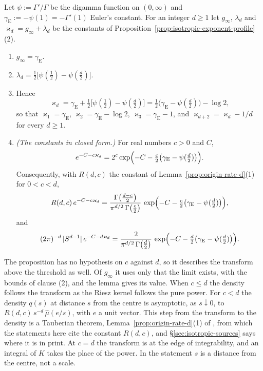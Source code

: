 \begin{lemma}\label{lem:exponent-profile-constant}
Let $\psi := \Gamma'/\Gamma$ be the digamma function on $(0,\infty)$ and
$\gamma_{\mathrm E} := -\psi(1) = -\Gamma'(1)$ Euler's constant. For an integer $d \ge 1$ let
$g_\infty$, $\lambda_d$ and $\varkappa_d = g_\infty + \lambda_d$ be the constants of
Proposition~\ref{prop:isotropic-exponent-profile}(2).
\begin{enumerate}
\item $g_\infty = \gamma_{\mathrm E}$.
\item $\lambda_d = \tfrac12\bigl[\psi(\tfrac12) - \psi(\tfrac d2)\bigr]$.
\item Hence
\[
  \varkappa_d = \gamma_{\mathrm E} + \tfrac12\bigl[\psi(\tfrac12) - \psi(\tfrac d2)\bigr]
   = \tfrac12\bigl(\gamma_{\mathrm E} - \psi(\tfrac d2)\bigr) - \log 2 ,
\]
so that $\varkappa_1 = \gamma_{\mathrm E}$, $\varkappa_2 = \gamma_{\mathrm E} - \log 2$,
$\varkappa_3 = \gamma_{\mathrm E} - 1$, and $\varkappa_{d+2} = \varkappa_d - 1/d$ for every
$d \ge 1$.
\item \emph{(The constants in closed form.)} For real numbers $c > 0$ and $C$,
\[
  e^{-C - c\varkappa_d}
   = 2^{c}\exp\Bigl(-C - \tfrac c2\bigl(\gamma_{\mathrm E} - \psi(\tfrac d2)\bigr)\Bigr) .
\]
Consequently, with $R(d,c)$ the constant of Lemma~\ref{prop:origin-rate-d}(1) for $0 < c < d$,
\[
  R(d,c)\,e^{-C - c\varkappa_d}
   = \frac{\Gamma\bigl(\tfrac{d-c}{2}\bigr)}{\pi^{d/2}\,\Gamma\bigl(\tfrac c2\bigr)}\,
     \exp\Bigl(-C - \tfrac c2\bigl(\gamma_{\mathrm E} - \psi(\tfrac d2)\bigr)\Bigr),
\]
and
\[
  (2\pi)^{-d}\,|S^{d-1}|\,e^{-C - d\varkappa_d}
   = \frac{2}{\pi^{d/2}\,\Gamma\bigl(\tfrac d2\bigr)}\,
     \exp\Bigl(-C - \tfrac d2\bigl(\gamma_{\mathrm E} - \psi(\tfrac d2)\bigr)\Bigr) .
\]
\end{enumerate}
\end{lemma}

The proposition has no hypothesis on $c$ against $d$, so it describes the transform above the
threshold as well. Of $g_\infty$ it uses only that the limit exists, with the bounds of clause
(2), and the lemma gives its value. When $c \le d$ the density follows the transform as the
Riesz kernel follows the pure power. For $c < d$ the density $q(s)$ at distance $s$ from the
centre is asymptotic, as $s \downarrow 0$, to $R(d,c)\,s^{-d}\,\widehat\mu(e/s)$, with $e$ a
unit vector. This step from the transform to the density is a Tauberian theorem,
Lemma~\ref{prop:origin-rate-d}(1) of \suppl, from which the statements here cite the constant
$R(d,c)$, and \S\ref{sec:isotropic-sources} says where it is in print. At $c = d$ the transform is at the edge of integrability, and an integral of $K$
takes the place of the power. In the statement $s$ is a distance from the centre, not a scale.

